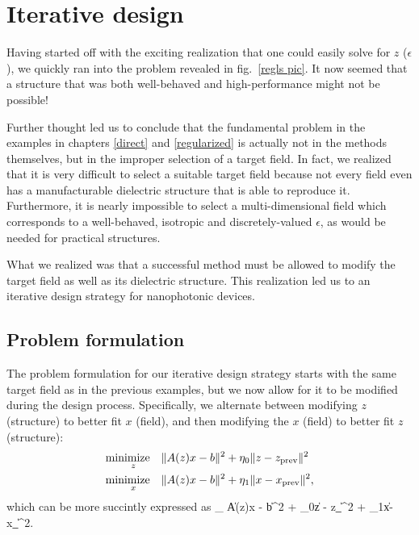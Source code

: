 \chapter{Iterative design} \label{iterative}
Having started off with the exciting realization that one could easily 
    solve for $z$ ($\epsilon$), we quickly ran into 
    the problem revealed in fig.~\ref{regls pic}.
It now seemed that a structure that was both well-behaved and high-performance
    might not be possible!

Further thought led us to conclude that
    the fundamental problem in the examples 
    in chapters \ref{direct} and \ref{regularized}
    is actually not in the methods themselves, 
    but in the improper selection of a target field. 
In fact, we realized that it is very difficult to select a suitable target field 
    because not every field even has a manufacturable dielectric structure 
    that is able to reproduce it. 
Furthermore, it is nearly impossible to select a multi-dimensional field 
    which corresponds to a well-behaved, isotropic and 
    discretely-valued $\epsilon$, 
    as would be needed for practical structures. 

What we realized was that a successful method 
    must be allowed to modify the target field as well as 
    its dielectric structure.
This realization led us to an iterative design strategy for nanophotonic devices.

\section{Problem formulation}
The problem formulation for our iterative design strategy
    starts with the same target field as in the previous examples,
    but we now allow for it to be modified during the design process. 
Specifically, we alternate between modifying $z$ (structure) 
    to better fit $x$ (field), 
    and then modifying the $x$ (field) to better fit $z$ (structure):
    \begin{subequations}\begin{align} 
    \operatorname*{\text{minimize}\quad}_z & \|A(z)x - b\|^2 + \eta_0\|z - z_\text{prev}\|^2 \\
    \operatorname*{\text{minimize}\quad}_x & \|A(z)x - b\|^2 + \eta_1\|x - x_\text{prev}\|^2,
    \end{align}\end{subequations}
which can be more succintly expressed as 
    \BE \minimize_ 
        \|A(z)x - b\|^2 + \eta_0\|z - z_\|^2
                        + \eta_1\|x-x_\|^2. \label{iterative problem}\EE


